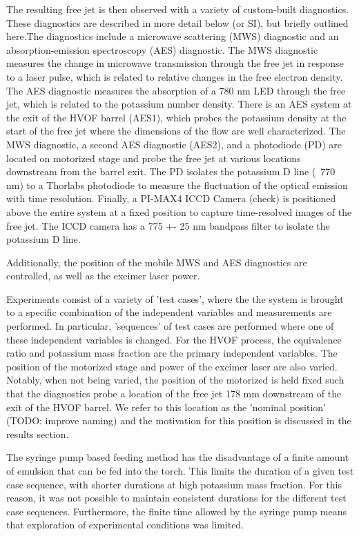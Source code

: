 The resulting free jet is then observed with a variety of custom-built diagnostics. These diagnostics are described in more detail below (or SI), but briefly outlined here.The diagnostics include a microwave scattering (MWS) diagnostic and an absorption-emission spectroscopy (AES) diagnostic. The MWS diagnostic measures the change in microwave transmission through the free jet in response to a laser pulse, which is related to relative changes in the free electron density. The AES diagnostic measures the absorption of a 780 nm LED through the free jet, which is related to the potassium number density. There is an AES system at the exit of the HVOF barrel (AES1), which probes the potassium density at the start of the free jet where the dimensions of the flow are well characterized. The MWS diagnostic, a second AES diagnostic (AES2), and a photodiode (PD) are located on motorized stage and probe the free jet at various locations downstream from the barrel exit. The PD isolates the potassium D line (~770 nm) to a Thorlabs photodiode to measure the fluctuation of the optical emission with time resolution. Finally, a PI-MAX4 ICCD Camera (check) is positioned above the entire system at a fixed position to capture time-resolved images of the free jet. The ICCD camera has a 775 +- 25 nm bandpass filter to isolate the potassium D line.

Additionally, the position of the mobile MWS and AES diagnostics are controlled, as well as the excimer laser power. 

Experiments consist of a variety of 'test cases', where the the system is brought to a specific combination of the independent variables and measurements are performed. In particular, 'sequences' of test cases are performed where one of these independent variables is changed. For the HVOF process, the equivalence ratio and potassium mass fraction are the primary independent variables. The position of the motorized stage and power of the excimer laser are also varied. Notably, when not being varied, the position of the motorized is held fixed such that the diagnostics probe a location of the free jet 178 mm downstream of the exit of the HVOF barrel. We refer to this location as the 'nominal position' (TODO: improve naming) and the motivation for this position is discussed in the results section.  

The syringe pump based feeding method has the disadvantage of a finite amount of emulsion that can be fed into the torch. This limits the duration of a given test case sequence, with shorter durations at high potassium mass fraction. For this reason, it was not possible to maintain consistent durations for the different test case sequences. Furthermore, the finite time allowed by the syringe pump means that exploration of experimental conditions was limited. 

